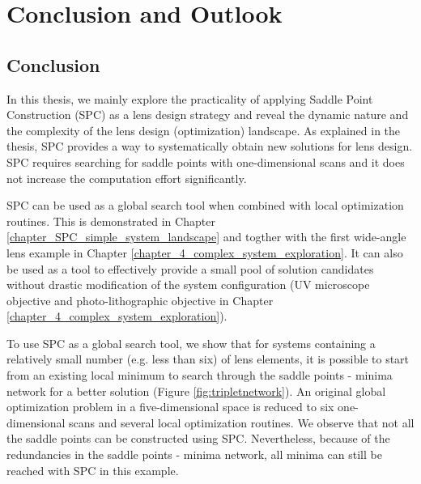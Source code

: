 \chapter{Conclusion and Outlook} %
\label{chapter_Conclusion} %
\graphicspath{ {./chapter-6/figures/} }  %
\captionsetup[figure]{labelfont=bf}
\captionsetup{margin=1.5em}
\captionsetup[table]{labelfont=bf}


\begin{comment}


\epigraph[0pt]{
Nel mezzo del cammin di nostra vita
mi ritrovai per una selva oscura,
che la diritta via era smarrita.

In the midst of life's journey
I found myself in a dark wood
where the right path was lost.

}{First stanza of Dante's Inferno}

\end{comment}
\section{Conclusion}
In this thesis, we mainly explore the practicality of applying  Saddle Point Construction (SPC) as a lens design strategy and reveal the dynamic nature and the complexity of the lens design (optimization) landscape.  As explained in the thesis, SPC provides a way to systematically obtain new solutions for lens design. SPC requires searching for saddle points with one-dimensional scans and it does not increase the computation effort significantly. 

SPC can be used as a global search tool when combined with local optimization routines. This is demonstrated in Chapter \ref{chapter_SPC_simple_system_landscape} and togther with the first wide-angle lens example in Chapter \ref{chapter_4_complex_system_exploration}. It can also be used as a tool to effectively provide a small pool of solution candidates without drastic modification of the system configuration (UV microscope objective and photo-lithographic objective in Chapter \ref{chapter_4_complex_system_exploration}). 

To use SPC as a global search tool, we show that for systems containing a relatively small number (e.g. less than six) of lens elements, it is possible to start from an existing local minimum to search through the saddle points - minima network for a better solution (Figure \ref{fig:tripletnetwork}). An original global optimization problem in a five-dimensional space is reduced to six one-dimensional scans and several local optimization routines. We observe that not all the saddle points can be constructed using SPC. Nevertheless, because of the redundancies in the saddle points - minima network, all minima can still be reached with SPC in this example. 


